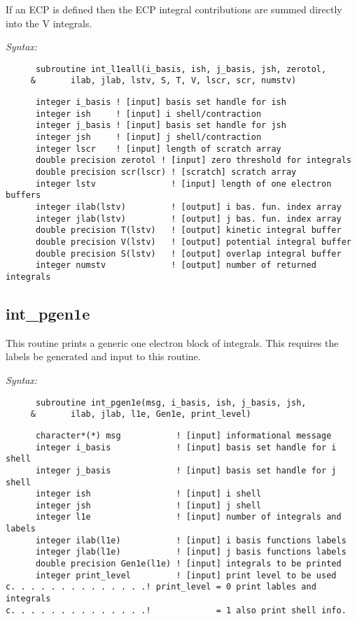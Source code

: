 If an ECP is defined then the ECP integral contributions are summed  
directly into the V integrals.   
 
{\it Syntax:} 
\begin{verbatim} 
      subroutine int_l1eall(i_basis, ish, j_basis, jsh, zerotol, 
     &       ilab, jlab, lstv, S, T, V, lscr, scr, numstv)  
\end{verbatim} 
\begin{verbatim} 
      integer i_basis ! [input] basis set handle for ish 
      integer ish     ! [input] i shell/contraction 
      integer j_basis ! [input] basis set handle for jsh 
      integer jsh     ! [input] j shell/contraction 
      integer lscr    ! [input] length of scratch array 
      double precision zerotol ! [input] zero threshold for integrals 
      double precision scr(lscr) ! [scratch] scratch array 
      integer lstv               ! [input] length of one electron buffers 
      integer ilab(lstv)         ! [output] i bas. fun. index array 
      integer jlab(lstv)         ! [output] j bas. fun. index array 
      double precision T(lstv)   ! [output] kinetic integral buffer 
      double precision V(lstv)   ! [output] potential integral buffer 
      double precision S(lstv)   ! [output] overlap integral buffer 
      integer numstv             ! [output] number of returned integrals 
\end{verbatim} 
\subsection{int\_pgen1e} 
This routine prints a generic one electron block of integrals. 
This requires the labels be generated and input to this routine. 
 
{\it Syntax:} 
\begin{verbatim} 
      subroutine int_pgen1e(msg, i_basis, ish, j_basis, jsh,  
     &       ilab, jlab, l1e, Gen1e, print_level) 
\end{verbatim} 
\begin{verbatim} 
      character*(*) msg           ! [input] informational message 
      integer i_basis             ! [input] basis set handle for i shell 
      integer j_basis             ! [input] basis set handle for j shell 
      integer ish                 ! [input] i shell 
      integer jsh                 ! [input] j shell  
      integer l1e                 ! [input] number of integrals and labels 
      integer ilab(l1e)           ! [input] i basis functions labels 
      integer jlab(l1e)           ! [input] j basis functions labels 
      double precision Gen1e(l1e) ! [input] integrals to be printed 
      integer print_level         ! [input] print level to be used 
c. . . . . . . . . . . . . .! print_level = 0 print lables and integrals 
c. . . . . . . . . . . . . .!             = 1 also print shell info. 
\end{verbatim} 
